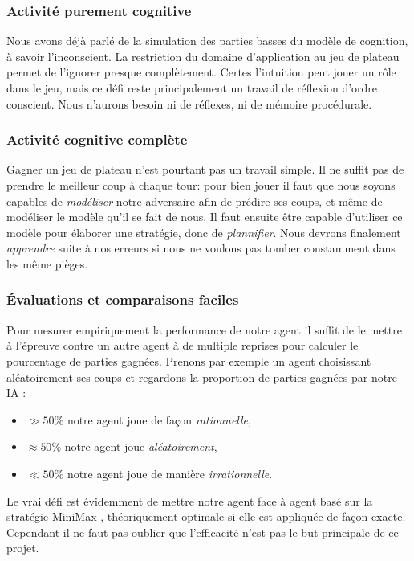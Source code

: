 \subsubsection{Activité purement cognitive}
Nous avons déjà parlé de la simulation des parties basses du modèle de cognition, à savoir l'inconscient. La restriction du domaine d'application au jeu de plateau permet de l'ignorer presque complètement. Certes l'intuition peut jouer un rôle dans le jeu, mais ce défi reste principalement un travail de réflexion d'ordre conscient. Nous n'aurons besoin ni de réflexes, ni de mémoire procédurale.

\subsubsection{Activité cognitive complète}
Gagner un jeu de plateau n'est pourtant pas un travail simple. Il ne suffit pas de prendre le \og meilleur \fg{} coup à chaque tour: pour bien jouer il faut que nous soyons capables de \emph{modéliser} notre adversaire afin de prédire ses coups, et même de modéliser le modèle qu'il se fait de nous. Il faut ensuite être capable d'utiliser ce modèle pour élaborer une stratégie, donc de \emph{plannifier}. Nous devrons finalement \emph{apprendre} suite à nos erreurs si nous ne voulons pas tomber constamment dans les même pièges. 

\subsubsection{Évaluations et comparaisons faciles}
Pour mesurer empiriquement la performance de notre agent il suffit de le mettre à l'épreuve contre un autre agent à de multiple reprises pour calculer le pourcentage de parties gagnées. Prenons par exemple un agent choisissant aléatoirement ses coups et regardons la proportion de parties gagnées par notre IA :

\begin{itemize}
\item $\gg 50 \% $ notre agent joue de façon \emph{rationnelle}, 
\item $\approx 50 \% $ notre agent joue \emph{aléatoirement},
\item $\ll 50 \% $ notre agent joue de manière \emph{irrationnelle}.
\end{itemize}

Le vrai défi est évidemment de mettre notre agent face à agent basé sur la stratégie \og MiniMax \fg{}, théoriquement optimale si elle est appliquée de façon exacte. Cependant il ne faut pas oublier que l'efficacité n'est pas le but principale de ce projet.

